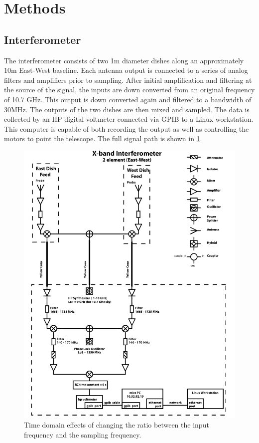 \documentclass{article}
\begin{document}
\section{Methods}
  \subsection{Interferometer}
  The interferometer consists of two 1m diameter dishes along an approximately
  10m East-West baseline. Each antenna output is connected to a series of analog
  filters and amplifiers prior to sampling.  After initial amplification and
  filtering at the source of the signal, the inputs are down converted from an
  original frequency of 10.7 GHz. This output is down converted again and
  filtered to a bandwidth of 30MHz. The outputs of the two dishes are then mixed
  and sampled.  The data is collected by an HP digital voltmeter connected via
  GPIB to a Linux workstation. This computer is capable of both recording the
  output as well as controlling the motors to point the telescope. The full
  signal path is shown in \ref{fig:signal_path}.

    \begin{figure}[h!]
    \centering
    \includegraphics[scale=0.7]{img/signal_path.png}
    \caption{Time domain effects of changing the ratio between the input frequency and the sampling frequency.}
    \label{fig:signal_path}
    \end{figure}
\end{document}
